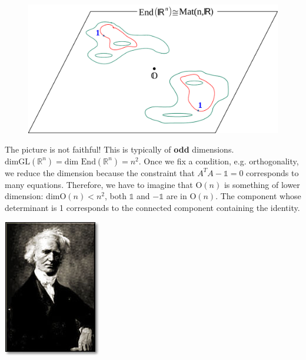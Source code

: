 \documentclass[../main.tex]{subfiles}
\begin{document}
\begin{figure}[h!]
    \centering
    \includegraphics{images/buchi.pdf}
    \caption*{}
\end{figure}
{\selectfont{}\relax} The picture is not faithful! This is typically of \textbf{odd} dimensions. $\text{dim}\textrm{GL}(\mathbb{R}^n)=\text{dim End}(\mathbb{R}^n)=n^2$. Once we fix a condition, e.g. orthogonality, we reduce the dimension because the constraint that $A^TA-\mathbb{1}=0$ corresponds to many equations. Therefore, we have to imagine that $\textrm{O}(n)$ is something of lower dimension: $\text{dim}\textrm{O}(n)<n^2$, both $\mathbb{1}$ and $-\mathbb{1}$ are in $\textrm{O}(n)$. The component whose determinant is 1 corresponds to the connected component containing the identity.\begin{marginfigure}
	\includegraphics[width=1\linewidth]{images/Jacques_Binet.jpg}

\end{marginfigure}
\end{document}
